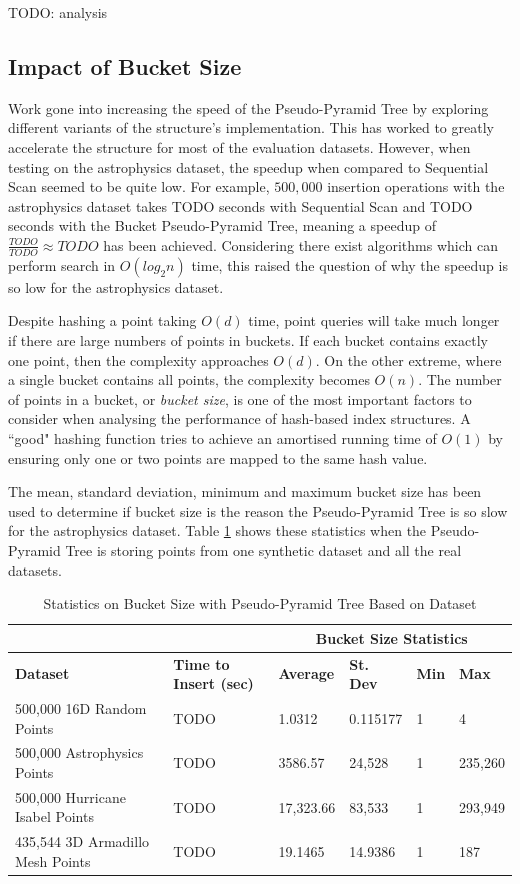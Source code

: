 TODO: analysis

\subsection{Impact of Bucket Size}

Work gone into increasing the speed of the Pseudo-Pyramid Tree by exploring different variants of the structure's implementation. This has worked to greatly accelerate the structure for most of the evaluation datasets. However, when testing on the astrophysics dataset, the speedup when compared to Sequential Scan seemed to be quite low. For example, $500,000$ insertion operations with the astrophysics dataset takes TODO seconds with Sequential Scan and TODO seconds with the Bucket Pseudo-Pyramid Tree, meaning a speedup of $\frac{TODO}{TODO} \approx TODO$ has been achieved. Considering there exist algorithms which can perform search in $O(log_2 n)$ time, this raised the question of why the speedup is so low for the astrophysics dataset.

Despite hashing a point taking $O(d)$ time, point queries will take much longer if there are large numbers of points in buckets. If each bucket contains exactly one point, then the complexity approaches $O(d)$. On the other extreme, where a single bucket contains all points, the complexity becomes $O(n)$. The number of points in a bucket, or \textit{bucket size}, is one of the most important factors to consider when analysing the performance of hash-based index structures. A ``good" hashing function tries to achieve an amortised running time of $O(1)$ by ensuring only one or two points are mapped to the same hash value.

The mean, standard deviation, minimum and maximum bucket size has been used to determine if bucket size is the reason the Pseudo-Pyramid Tree is so slow for the astrophysics dataset. Table \ref{tab:perf1-bucket-stats} shows these statistics when the Pseudo-Pyramid Tree is storing points from one synthetic dataset and all the real datasets.

\begin{table}
	\centering
	\begin{tabular}{|l|l|l|l|l|l|}
		\hline
		& & \multicolumn{4}{c|}{\textbf{Bucket Size Statistics}} \\
		\hline
		\textbf{Dataset} & \textbf{Time to Insert (sec)} & \textbf{Average} & \textbf{St. Dev} & \textbf{Min} & \textbf{Max} \\
		\hline
		500,000 16D Random Points & TODO & 1.0312 & 0.115177 & 1 & 4 \\
		500,000 Astrophysics Points & TODO & 3586.57 & 24,528 & 1 & 235,260 \\
		500,000 Hurricane Isabel Points & TODO & 17,323.66 & 83,533 & 1 & 293,949 \\
		435,544 3D Armadillo Mesh Points & TODO & 19.1465 & 14.9386 & 1 & 187 \\
		\hline
	\end{tabular}
	\caption{Statistics on Bucket Size with Pseudo-Pyramid Tree Based on Dataset}
	\label{tab:perf1-bucket-stats}
\end{table}

